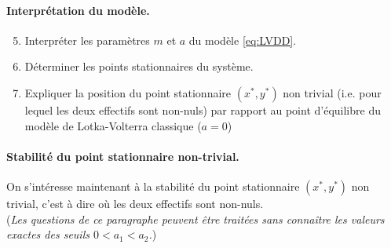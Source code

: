 \paragraph{Interprétation du modèle.}
\begin{enumerate}
  \setcounter{enumi}{4}
  \item Interpréter les paramètres $m$ et $a$ du modèle \eqref{eq:LVDD}.
  \item Déterminer les points stationnaires du système.
  \item Expliquer la position du point stationnaire $(x^*, y^*)$ non trivial (i.e. pour lequel les deux effectifs sont non-nuls) par rapport au point d'équilibre du modèle de Lotka-Volterra classique ($a=0$)
\end{enumerate}

\bigskip
\bigskip
\paragraph{Stabilité du point stationnaire non-trivial.}
On s'intéresse maintenant à la stabilité du point stationnaire $(x^*, y^*)$ non trivial, c'est à dire où les deux effectifs sont non-nuls. \\
({\sl Les questions de ce paragraphe peuvent être traitées sans connaître les valeurs exactes des seuils $0 < a_1 < a_2$.})

